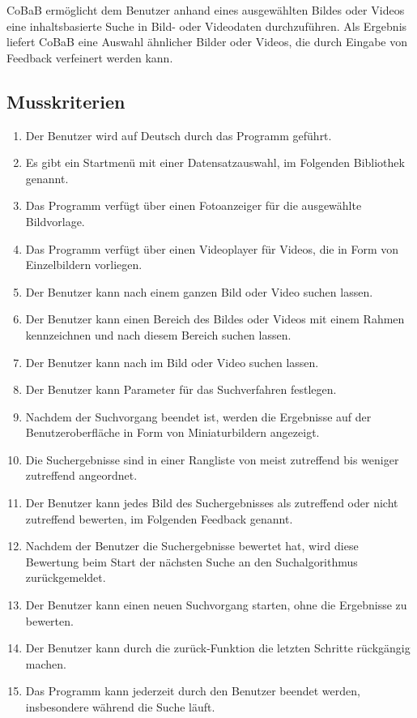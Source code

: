CoBaB ermöglicht dem Benutzer anhand eines ausgewählten Bildes oder Videos eine inhaltsbasierte Suche in Bild- oder Videodaten durchzuführen. Als Ergebnis liefert CoBaB eine Auswahl ähnlicher Bilder oder Videos, die durch Eingabe von \gls{Feedback} verfeinert werden kann.
\subsection{Musskriterien}
\begin{enumerate} [label=\bfseries /MK \arabic*0/, leftmargin=*]
\item Der Benutzer wird auf Deutsch durch das Programm geführt.
\item Es gibt ein Startmenü mit einer Datensatzauswahl, im Folgenden Bibliothek genannt.
\item Das Programm verfügt über einen Fotoanzeiger für die ausgewählte Bildvorlage.
\item Das Programm verfügt über einen Videoplayer für Videos, die in Form von Einzelbildern vorliegen.
\item Der Benutzer kann nach einem ganzen Bild oder Video suchen lassen.
\item Der Benutzer kann einen Bereich des Bildes oder Videos mit einem Rahmen kennzeichnen und nach diesem Bereich suchen lassen.
\item Der Benutzer kann nach  im Bild oder Video suchen lassen.
\item Der Benutzer kann Parameter für das Suchverfahren festlegen.
\item Nachdem der Suchvorgang beendet ist, werden die Ergebnisse auf der Benutzeroberfläche in Form von Miniaturbildern angezeigt.
\item Die Suchergebnisse sind in einer Rangliste von meist zutreffend bis weniger zutreffend angeordnet.
\item Der Benutzer kann jedes Bild des Suchergebnisses als zutreffend oder nicht zutreffend bewerten, im Folgenden \gls{Feedback} genannt.
\item Nachdem der Benutzer die Suchergebnisse bewertet hat, wird diese Bewertung beim Start der nächsten Suche an den Suchalgorithmus zurückgemeldet.
\item Der Benutzer kann einen neuen Suchvorgang starten, ohne die Ergebnisse zu bewerten.
\item Der Benutzer kann durch die zurück-Funktion die letzten Schritte rückgängig machen.
\item Das Programm kann jederzeit durch den Benutzer beendet werden, insbesondere während die Suche läuft.

\end{enumerate}
